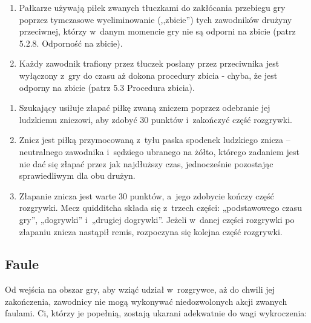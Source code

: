 \documentclass[12pt,a4paper]{article}
\renewcommand{\subsubsection}[1]{
  \oldsubsubsection{#1}%
  \leftskip1.5cm
}
\begin{document}
\subsubsection{Pałkarze}
\begin{enumerate}
	\item Pałkarze używają piłek zwanych tłuczkami do zakłócania przebiegu gry
	      poprzez tymczasowe wyeliminowanie (,,zbicie'') tych zawodników drużyny
	      przeciwnej, którzy w~danym momencie gry nie są odporni na zbicie (patrz
	      5.2.8. Odporność na zbicie).

	\item Każdy zawodnik trafiony przez tłuczek posłany przez przeciwnika jest
	      wyłączony z~gry do czasu aż dokona procedury zbicia - chyba, że jest
	      odporny na zbicie (patrz 5.3 Procedura zbicia).
\end{enumerate}

\subsubsection{Szukający}
\begin{enumerate}
	\item Szukający usiłuje złapać piłkę zwaną zniczem poprzez odebranie jej
	      ludzkiemu zniczowi, aby zdobyć 30 punktów i~zakończyć część rozgrywki.

	\item Znicz jest piłką przymocowaną z~tyłu paska spodenek ludzkiego znicza
	      -- neutralnego zawodnika i~sędziego ubranego na żółto,
	      którego zadaniem jest nie dać się złapać przez jak najdłuższy czas,
	      jednocześnie pozostając sprawiedliwym dla obu drużyn.

	\item Złapanie znicza jest warte 30 punktów, a~jego zdobycie kończy część
	      rozgrywki. Mecz quidditcha składa się z~trzech części: „podstawowego
	      czasu gry'', „dogrywki'' i~„drugiej dogrywki''. Jeżeli w~danej części
	      rozgrywki po złapaniu znicza nastąpił remis, rozpoczyna się kolejna
	      część rozgrywki.
\end{enumerate}

\subsection{Faule}
Od wejścia na obszar gry, aby wziąć udział w~rozgrywce, aż do chwili jej zakończenia, zawodnicy nie mogą wykonywać niedozwolonych akcji zwanych faulami. Ci, którzy je popełnią, zostają ukarani adekwatnie do wagi wykroczenia: 
\end{document}

